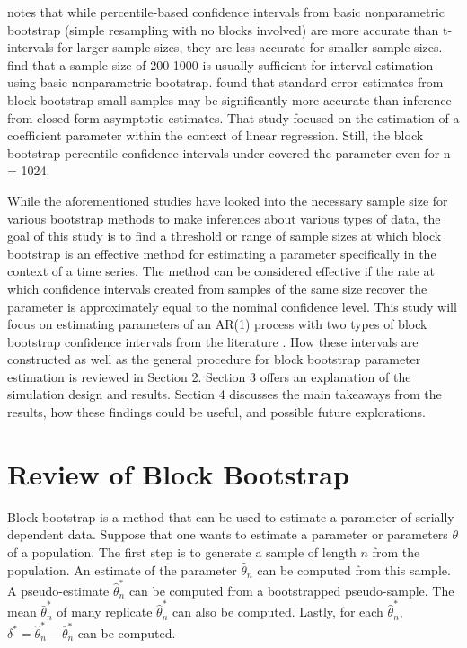 \documentclass[12pt, letterpaper, titlepage]{article}
\begin{document}
\citet{hesterberg2015teachers} notes that while percentile-based confidence
intervals from basic nonparametric bootstrap (simple resampling with no blocks
involved) are more accurate than t-intervals for larger sample sizes, they are
less accurate for smaller sample sizes. \citet{nevitt2001performance} find
that a sample size of 200-1000 is usually sufficient for interval estimation
using basic nonparametric bootstrap. \citet{goncalves2005bootstrap} found that
standard error estimates from block bootstrap small samples may be
significantly more accurate than inference from closed-form asymptotic
estimates. That study focused on the estimation of a coefficient parameter
within the context of linear regression. Still, the block bootstrap percentile
confidence intervals under-covered the parameter even for n = 1024. 


While the aforementioned studies have looked into the necessary sample size
for various bootstrap methods to make inferences about various types of data,
the goal of this study is to find a threshold or range of sample sizes at
which block bootstrap is an effective method for estimating a parameter
specifically in the context of a time series. The method can be considered
effective if the rate at which confidence intervals created from samples of
the same size recover the parameter is approximately equal to the nominal
confidence level. This study will focus on estimating parameters of an AR(1)
process with two types of block bootstrap confidence intervals from the
literature \citep{diciccio1996bootstrap} \citep{rice2006mathematical}. How
these intervals are constructed as well as the general procedure for block
bootstrap parameter estimation is reviewed in Section 2. Section 3 offers an
explanation of the simulation design and results. Section 4 discusses the main
takeaways from the results, how these findings could be useful, and possible
future explorations.


\section{Review of Block Bootstrap}
\label{sec:blkbootreview}

Block bootstrap is a method that can be used to estimate a parameter of
serially dependent data. Suppose that one wants to estimate a parameter or
parameters $\theta$ of a population. The first step is to generate a sample of
length $n$ from the population. An estimate of the parameter
$\hat{\theta}_{n}$ can be computed from this sample. A pseudo-estimate
$\hat\theta_n^*$ can be computed from a bootstrapped pseudo-sample. The mean
$\bar\theta_n^*$ of many replicate $\hat\theta_n^*$ can also be computed.
Lastly, for each $\hat\theta_n^*$, $\delta^* = \hat\theta_n^* -
\bar\theta_n^*$ can be computed.
\end{document}
